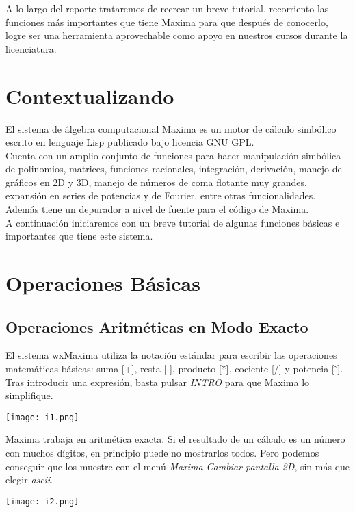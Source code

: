 \documentclass[12pt]{article}
\begin{document}
A lo largo del reporte trataremos de recrear un breve tutorial, recorriento las funciones más importantes que tiene Maxima para que después de conocerlo, logre ser una herramienta aprovechable como apoyo en nuestros cursos durante la licenciatura.

\section*{Contextualizando}
El sistema de álgebra computacional Maxima es un motor de cálculo simbólico escrito en lenguaje Lisp publicado bajo licencia GNU GPL.\\

Cuenta con un amplio conjunto de funciones para hacer manipulación simbólica de polinomios, matrices, funciones racionales, integración, derivación, manejo de gráficos en 2D y 3D, manejo de números de coma flotante muy grandes, expansión en series de potencias y de Fourier, entre otras funcionalidades. Además tiene un depurador a nivel de fuente para el código de Maxima.\\

A continuación iniciaremos con un breve tutorial de algunas funciones básicas e importantes que tiene este sistema.

\section*{Operaciones Básicas}
\subsection*{Operaciones Aritméticas en Modo Exacto}
El sistema wxMaxima utiliza la notación estándar para escribir las operaciones matemáticas
básicas: suma [+], resta [‐], producto [*], cociente [/] y potencia [\,\^\,]. Tras introducir una
expresión, basta pulsar \textit{INTRO} para que Maxima lo simplifique.

\begin{center}
    \texttt{[image: i1.png]}
\end{center}

Maxima trabaja en aritmética exacta. Si el resultado de un cálculo es un número con muchos dígitos, en principio puede no mostrarlos todos. Pero podemos conseguir que los muestre con el menú \textit{ Maxima‐Cambiar pantalla 2D}, sin más que elegir \textit{ ascii}.

\begin{center}
    \texttt{[image: i2.png]}
\end{center}
\end{document}
